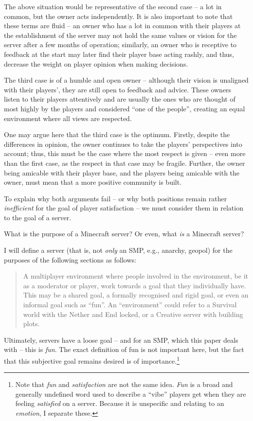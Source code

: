 The above situation would be representative of the second case – a lot in common, but the owner acts independently. It is also important to note that these terms are fluid – an owner who has a lot in common with their players at the establishment of the server may not hold the same values or vision for the server after a few months of operation; similarly, an owner who is receptive to feedback at the start may later find their player base acting rashly, and thus, decrease the weight on player opinion when making decisions.

The third case is of a humble and open owner – although their vision is unaligned with their players’, they are still open to feedback and advice. These owners listen to their players attentively and are usually the ones who are thought of most highly by the players and considered “one of the people”, creating an equal environment where all views are respected.

One may argue here that the third case is the optimum. Firstly, despite the differences in opinion, the owner continues to take the players’ perspectives into account; thus, this must be the case where the most respect is given – even more than the first case, as the respect in that case may be fragile. Further, the owner being amicable with their player base, and the players being amicable with the owner, must mean that a more positive community is built.

To explain why both arguments fail – or why both positions remain rather \emph{inefficient} for the goal of player satisfaction – we must consider them in relation to the goal of a server.

What is the purpose of a Minecraft server? Or even, what \emph{is} a Minecraft server?

I will define a server (that is, not \emph{only} an SMP, e.g., anarchy, geopol) for the purposes of the following sections as follows:
\begin{quote}
    A multiplayer environment where people involved in the environment, be it as a moderator or player, work towards a goal that they individually have. This may be a shared goal, a formally recognised and rigid goal, or even an informal goal such as “fun”. An “environment” could refer to a Survival world with the Nether and End locked, or a Creative server with building plots.
\end{quote}
Ultimately, servers have a loose goal – and for an SMP, which this paper deals with – this is \emph{fun}. The exact definition of fun is not important here, but the fact that this subjective goal remains desired is of importance.\footnote{Note that \emph{fun} and \emph{satisfaction} are not the same idea. \emph{Fun} is a broad and generally undefined word used to describe a “vibe” players get when they are feeling \emph{satisfied} on a server. Because it is unspecific and relating to an \emph{emotion}, I separate these.}

